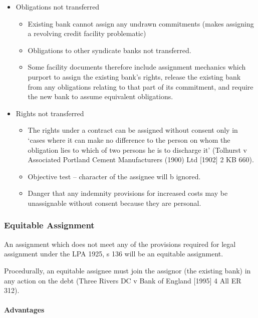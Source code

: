 \documentclass[
]{article}
\providecommand{\tightlist}{%
  \setlength{\itemsep}{0pt}\setlength{\parskip}{0pt}}
\begin{document}
\begin{itemize}
\tightlist
\item
  Obligations not transferred

  \begin{itemize}
  \tightlist
  \item
    Existing bank cannot assign any undrawn commitments (makes assigning
    a revolving credit facility problematic)
  \item
    Obligations to other syndicate banks not transferred.
  \item
    Some facility documents therefore include assignment mechanics which
    purport to assign the existing bank's rights, release the existing
    bank from any obligations relating to that part of its commitment,
    and require the new bank to assume equivalent obligations.
  \end{itemize}
\item
  Rights not transferred

  \begin{itemize}
  \tightlist
  \item
    The rights under a contract can be assigned without consent only in
    `cases where it can make no difference to the person on whom the
    obligation lies to which of two persons he is to discharge it'
    (Tolhurst v Associated Portland Cement Manufacturers (1900) Ltd
    {[}1902{]} 2 KB 660).
  \item
    Objective test -- character of the assignee will b ignored.
  \item
    Danger that any indemnity provisions for increased costs may be
    unassignable without consent because they are personal.
  \end{itemize}
\end{itemize}

\hypertarget{equitable-assignment}{%
\subsubsection{Equitable Assignment}\label{equitable-assignment}}

An assignment which does not meet any of the provisions required for
legal assignment under the LPA 1925, s 136 will be an equitable
assignment.

Procedurally, an equitable assignee must join the assignor (the existing
bank) in any action on the debt (Three Rivers DC v Bank of England
{[}1995{]} 4 All ER 312).

\hypertarget{advantages-2}{%
\paragraph{Advantages}\label{advantages-2}}
\end{document}
